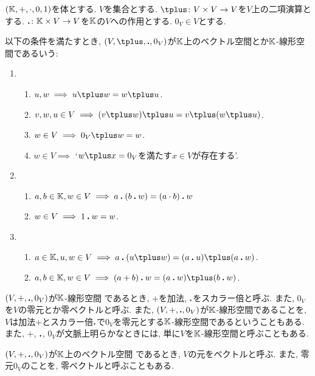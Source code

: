 \begin{definition}
  $(\mathbb{K},+,\cdot,0,1)$を体とする.
  $V$を集合とする.
  $\pplus\colon V\times V \to V$を$V$上の二項演算とする.
  $\mathbin{\boldsymbol{.}} \colon \mathbb{K}\times V \to V$を$\mathbb{K}$の$V$への作用とする.
  $0_V \in V$とする.

  以下の条件を満たすとき,
  $(V,\pplus,\act ,0_V)$が$\mathbb{K}$上のベクトル空間とか$\mathbb{K}$-線形空間であるいう:
  \begin{enumerate}
  \item 
    \begin{enumerate}
    \item $u,w\implies  u\pplus w=w\pplus u$.
    \item
      \label{def:vecsp:item:sum:ass}
      $v,w,u\in V \implies (v\pplus w)\pplus u=v\pplus (w\pplus u)$.
    \item $w\in V \implies 0_V\pplus w=w$.
    \item $w\in V\implies $ `$w\pplus x=0_V$を満たす$x\in V$が存在する'.
    \end{enumerate}
  \item
    \begin{enumerate}
    \item
      \label{def:vecsp:item:prod:ass}
      $a,b\in\mathbb{K}, w\in V \implies a\mathbin{\boldsymbol{.}} (b\mathbin{\boldsymbol{.}} w)=(a\cdot b)\mathbin{\boldsymbol{.}} w$
    \item $w\in V \implies 1\mathbin{\boldsymbol{.}} w=w$.
    \end{enumerate}
  \item
    \begin{enumerate}
    \item $a\in \KK,u,w\in V \implies a\act (u\pplus w)=(a\act u)\pplus (a\act w)$.
    \item $a,b\in\KK, w\in V\implies (a+b)\act w=(a\act w)\pplus (b\act w)$.
    \end{enumerate}
  \end{enumerate}
\end{definition}
\begin{remark}
  $(V,+,\mathbin{\boldsymbol{.}} ,0_V)$が$\mathbb{K}$-線形空間
  であるとき,
  $+$を加法, $\mathbin{\boldsymbol{.}} $をスカラー倍と呼ぶ.
  また, $0_V$を$V$の零元とか零ベクトルと呼ぶ.
  また, 
  $(V,+,\mathbin{\boldsymbol{.}} ,0_V)$が$\mathbb{K}$-線形空間であることを,
  $V$は加法$+$とスカラー倍$\mathbin{\boldsymbol{.}} $で$0_V$を零元とする$\mathbb{K}$-線形空間であるということもある.
  また, $+$, $\mathbin{\boldsymbol{.}} $, $0_V$が文脈上明らかなときには,
  単に$V$を$\mathbb{K}$-線形空間と呼ぶこともある.
\end{remark}
\begin{remark}
  $(V,+,\mathbin{\boldsymbol{.}} ,0_V)$が$\mathbb{K}$上のベクトル空間
  であるとき,
  $V$の元をベクトルと呼ぶ.
  また, 零元$0_V$のことを, 零ベクトルと呼ぶこともある.
\end{remark}

